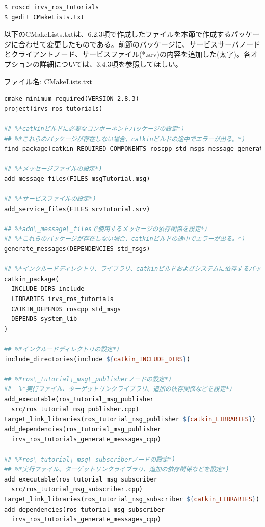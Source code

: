 \begin{lstlisting}[language=ROS]
$ roscd irvs_ros_tutorials
$ gedit CMakeLists.txt
\end{lstlisting}

以下のCMakeLists.txtは、6.2.3項で作成したファイルを本節で作成するパッケージに合わせて変更したものである。前節のパッケージに、サービスサーバノードとクライアントノード、サービスファイル(*.srv)の内容を追加した(太字)。各オプションの詳細については、3.4.3項を参照してほしい。

ファイル名: CMakeLists.txt
\begin{lstlisting}[language=make]
cmake_minimum_required(VERSION 2.8.3)
project(irvs_ros_tutorials)

## %*catkinビルドに必要なコンポーネントパッケージの設定*)
## %*これらのパッケージが存在しない場合、catkinビルドの途中でエラーが出る。*)
find_package(catkin REQUIRED COMPONENTS roscpp std_msgs message_generation)

## %*メッセージファイルの設定*)
add_message_files(FILES msgTutorial.msg)

## %*サービスファイルの設定*)
add_service_files(FILES srvTutorial.srv)

## %*add\_message\_filesで使用するメッセージの依存関係を設定*)
## %*これらのパッケージが存在しない場合、catkinビルドの途中でエラーが出る。*)
generate_messages(DEPENDENCIES std_msgs)

## %*インクルードディレクトリ、ライブラリ、catkinビルドおよびシステムに依存するパッケージの指定*)
catkin_package(
  INCLUDE_DIRS include
  LIBRARIES irvs_ros_tutorials
  CATKIN_DEPENDS roscpp std_msgs
  DEPENDS system_lib
)

## %*インクルードディレクトリの設定*)
include_directories(include ${catkin_INCLUDE_DIRS})

## %*ros\_tutorial\_msg\_publisherノードの設定*)
##  %*実行ファイル、ターゲットリンクライブラリ、追加の依存関係などを設定*)
add_executable(ros_tutorial_msg_publisher
  src/ros_tutorial_msg_publisher.cpp)
target_link_libraries(ros_tutorial_msg_publisher ${catkin_LIBRARIES})
add_dependencies(ros_tutorial_msg_publisher
  irvs_ros_tutorials_generate_messages_cpp)

## %*ros\_tutorial\_msg\_subscriberノードの設定*)
## %*実行ファイル、ターゲットリンクライブラリ、追加の依存関係などを設定*)
add_executable(ros_tutorial_msg_subscriber
  src/ros_tutorial_msg_subscriber.cpp)
target_link_libraries(ros_tutorial_msg_subscriber ${catkin_LIBRARIES})
add_dependencies(ros_tutorial_msg_subscriber
  irvs_ros_tutorials_generate_messages_cpp)


\end{lstlisting}
